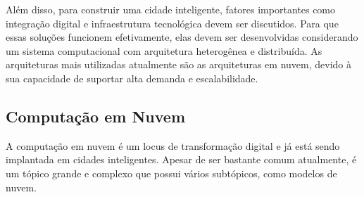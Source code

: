 Além disso, para construir uma cidade inteligente, fatores importantes como integração digital e infraestrutura tecnológica devem ser discutidos. Para que essas soluções funcionem efetivamente, elas devem ser desenvolvidas considerando um sistema computacional com arquitetura heterogênea e distribuída. As arquiteturas mais utilizadas atualmente são as arquiteturas em nuvem, devido à sua capacidade de suportar alta demanda e escalabilidade.

\subsection{Computação em Nuvem}
A computação em nuvem é um locus de transformação digital e já está sendo implantada em cidades inteligentes. Apesar de ser bastante comum atualmente, é um tópico grande e complexo que possui vários subtópicos, como modelos de nuvem.

